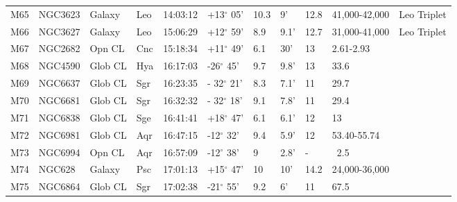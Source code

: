 \begin{longtable}{@{}lllllllllll@{}}
M65        & NGC3623     & Galaxy     & Leo       & 14:03:12 & +13$^{\circ}$ 05'  & 10.3      & 9'                   & 12.8     & 41,000-42,000       & Leo Triplet                               \\
M66        & NGC3627     & Galaxy     & Leo       & 15:06:29 & +12$^{\circ}$ 59'  & 8.9       & 9.1'                 & 12.7     & 31,000-41,000       & Leo Triplet                               \\
M67        & NGC2682     & Opn CL     & Cnc       & 15:18:34 & +11$^{\circ}$ 49'  & 6.1       & 30'                  & 13       & 2.61-2.93           &                                           \\
M68        & NGC4590     & Glob CL    & Hya       & 16:17:03 & -26$^{\circ}$ 45'  & 9.7       & 9.8'                 & 13       & 33.6                &                                           \\
M69        & NGC6637     & Glob CL    & Sgr       & 16:23:35 & - 32$^{\circ}$ 21' & 8.3       & 7.1'                 & 11       & 29.7                &                                           \\
M70        & NGC6681     & Glob CL    & Sgr       & 16:32:32 & - 32$^{\circ}$ 18' & 9.1       & 7.8'                 & 11       & 29.4                &                                           \\
M71        & NGC6838     & Glob CL    & Sge       & 16:41:41 & +18$^{\circ}$ 47'  & 6.1       & 6.1'                 & 12       & 13                  &                                           \\
M72        & NGC6981     & Glob CL    & Aqr       & 16:47:15 & -12$^{\circ}$ 32'  & 9.4       & 5.9'                 & 12       & 53.40-55.74         &                                           \\
M73        & NGC6994     & Opn CL     & Aqr       & 16:57:09 & -12$^{\circ}$ 38'  & 9         & 2.8'                 & -        & ~2.5                &                                           \\
M74        & NGC628      & Galaxy     & Psc       & 17:01:13 & +15$^{\circ}$ 47'  & 10        & 10'                  & 14.2     & 24,000-36,000       &                                           \\
M75        & NGC6864     & Glob CL    & Sgr       & 17:02:38 & -21$^{\circ}$ 55'  & 9.2       & 6'                   & 11       & 67.5                &                                           \\

\end{longtable}
